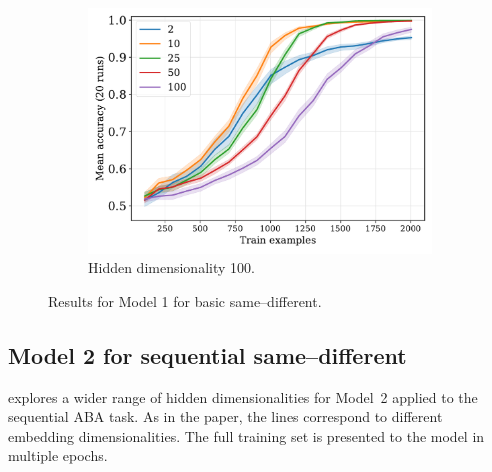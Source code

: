 \begin{figure}[H]
  \begin{subfigure}{0.45\linewidth}
    \includegraphics[width=1\textwidth]{../fig/equality-train_size-embed_dim-hidden_dim=100.pdf}
    \caption{Hidden dimensionality 100.}
    \label{fig:model1-rep}
  \end{subfigure}
  \caption{Results for Model 1 for basic same--different.}
  \label{fig:model1}
\end{figure}


\newpage


\subsection{Model 2 for sequential same--different}

 explores a wider range of hidden dimensionalities for Model~2 applied to the sequential ABA task. As in the paper, the lines correspond to different embedding dimensionalities. The full training set is presented to the model in multiple epochs.

